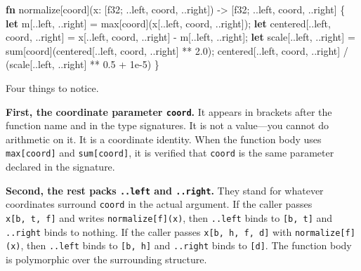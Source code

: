 \documentclass[11pt,titlepage]{article}
\newenvironment{Shaded}{}{}
\newcommand{\DataTypeTok}[1]{\textcolor[rgb]{0.56,0.13,0.00}{#1}}
\newcommand{\DecValTok}[1]{\textcolor[rgb]{0.25,0.63,0.44}{#1}}
\newcommand{\KeywordTok}[1]{\textcolor[rgb]{0.00,0.44,0.13}{\textbf{#1}}}
\newcommand{\NormalTok}[1]{#1}
\newcommand{\OperatorTok}[1]{\textcolor[rgb]{0.40,0.40,0.40}{#1}}
\begin{document}
\begin{Shaded}
\begin{Highlighting}[]
\KeywordTok{fn}\NormalTok{ normalize[coord](x: }\OperatorTok{[}\DataTypeTok{f32}\NormalTok{; ..left, coord, ..right}\OperatorTok{]}\NormalTok{)}
\NormalTok{    -> }\OperatorTok{[}\DataTypeTok{f32}\NormalTok{; ..left, coord, ..right}\OperatorTok{]}
\OperatorTok{\{}
    \KeywordTok{let}\NormalTok{ m}\OperatorTok{[}\NormalTok{..left, ..right}\OperatorTok{]}\NormalTok{ = max}\OperatorTok{[}\NormalTok{coord}\OperatorTok{]}\NormalTok{(x}\OperatorTok{[}\NormalTok{..left, coord, ..right}\OperatorTok{]}\NormalTok{);}
    \KeywordTok{let}\NormalTok{ centered}\OperatorTok{[}\NormalTok{..left, coord, ..right}\OperatorTok{]}\NormalTok{ = x}\OperatorTok{[}\NormalTok{..left, coord, ..right}\OperatorTok{]}\NormalTok{ - m}\OperatorTok{[}\NormalTok{..left, ..right}\OperatorTok{]}\NormalTok{;}
    \KeywordTok{let}\NormalTok{ scale}\OperatorTok{[}\NormalTok{..left, ..right}\OperatorTok{]}\NormalTok{ = sum}\OperatorTok{[}\NormalTok{coord}\OperatorTok{]}\NormalTok{(centered}\OperatorTok{[}\NormalTok{..left, coord, ..right}\OperatorTok{]}\NormalTok{ ** }\DecValTok{2.0}\NormalTok{);}
\NormalTok{    centered}\OperatorTok{[}\NormalTok{..left, coord, ..right}\OperatorTok{]}\NormalTok{ / (scale}\OperatorTok{[}\NormalTok{..left, ..right}\OperatorTok{]}\NormalTok{ ** }\DecValTok{0.5}\NormalTok{ + }\DecValTok{1}\NormalTok{e-}\DecValTok{5}\NormalTok{)}
\OperatorTok{\}}
\end{Highlighting}
\end{Shaded}

Four things to notice.

\textbf{First, the coordinate parameter \texttt{coord}.} It appears in
brackets after the function name and in the type signatures. It is not a
value---you cannot do arithmetic on it. It is a coordinate identity.
When the function body uses \texttt{max{[}coord{]}} and
\texttt{sum{[}coord{]}}, it is verified that \texttt{coord} is the same
parameter declared in the signature.

\textbf{Second, the rest packs \texttt{..left} and \texttt{..right}.}
They stand for whatever coordinates surround \texttt{coord} in the
actual argument. If the caller passes \texttt{x{[}b,\ t,\ f{]}} and
writes \texttt{normalize{[}f{]}(x)}, then \texttt{..left} binds to
\texttt{{[}b,\ t{]}} and \texttt{..right} binds to nothing. If the
caller passes \texttt{x{[}b,\ h,\ f,\ d{]}} with
\texttt{normalize{[}f{]}(x)}, then \texttt{..left} binds to
\texttt{{[}b,\ h{]}} and \texttt{..right} binds to \texttt{{[}d{]}}. The
function body is polymorphic over the surrounding structure.
\end{document}
